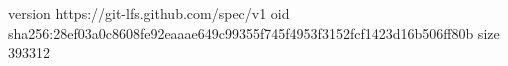 version https://git-lfs.github.com/spec/v1
oid sha256:28ef03a0c8608fe92eaaae649c99355f745f4953f3152fcf1423d16b506ff80b
size 393312
